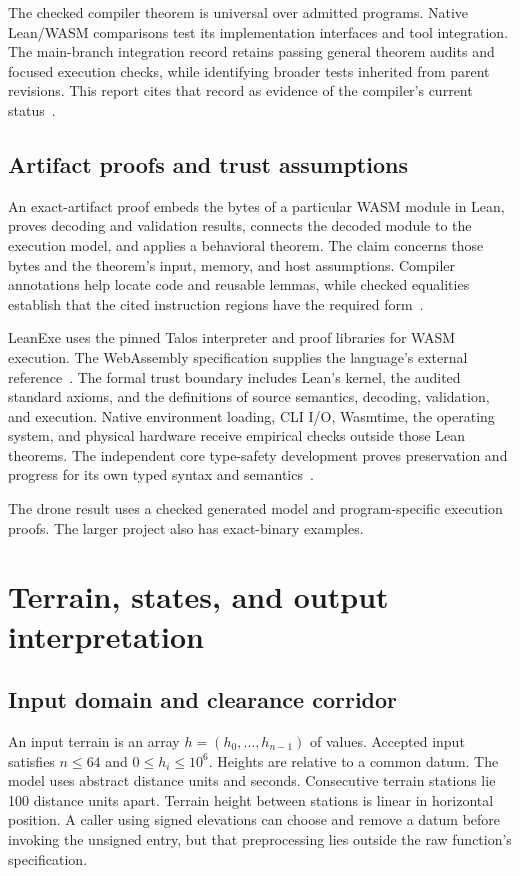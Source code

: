 \documentclass[11pt]{article}
\begin{document}
The checked compiler theorem is universal over admitted programs.  Native Lean/WASM comparisons test its implementation interfaces and tool integration.  The main-branch integration record retains passing general theorem audits and focused execution checks, while identifying broader tests inherited from parent revisions.  This report cites that record as evidence of the compiler's current status~\cite{main-integration}.

\subsection{Artifact proofs and trust assumptions}

An exact-artifact proof embeds the bytes of a particular WASM module in Lean, proves decoding and validation results, connects the decoded module to the execution model, and applies a behavioral theorem.  The claim concerns those bytes and the theorem's input, memory, and host assumptions.  Compiler annotations help locate code and reusable lemmas, while checked equalities establish that the cited instruction regions have the required form~\cite{leanexe-main}.

LeanExe uses the pinned Talos interpreter and proof libraries for WASM execution.  The WebAssembly specification supplies the language's external reference~\cite{wasm}.  The formal trust boundary includes Lean's kernel, the audited standard axioms, and the definitions of source semantics, decoding, validation, and execution.  Native environment loading, CLI I/O, Wasmtime, the operating system, and physical hardware receive empirical checks outside those Lean theorems.  The independent core type-safety development proves preservation and progress for its own typed syntax and semantics~\cite{leanexe-main,compiler-correctness}.

The drone result uses a checked generated model and program-specific execution proofs.  The larger project also has exact-binary examples.

\section{Terrain, states, and output interpretation}
\label{sec:model}

\subsection{Input domain and clearance corridor}

An input terrain is an array $h=(h_0,\ldots,h_{n-1})$ of  values.  Accepted input satisfies $n\leq64$ and $0\leq h_i\leq10^6$.  Heights are relative to a common datum.  The model uses abstract distance units and seconds.  Consecutive terrain stations lie 100 distance units apart.  Terrain height between stations is linear in horizontal position.  A caller using signed elevations can choose and remove a datum before invoking the unsigned entry, but that preprocessing lies outside the raw function's specification.
\end{document}
